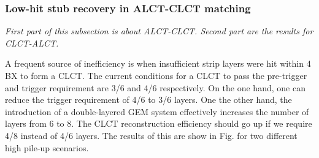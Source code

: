 %
%
%

\subsubsection{Low-hit stub recovery in ALCT-CLCT matching}

\textit{First part of this subsection is about ALCT-CLCT. Second part are the results for CLCT-ALCT.}

A frequent source of inefficiency is when insufficient strip layers were hit within 4 BX to form a CLCT. The current conditions for a CLCT to pass the pre-trigger and trigger requirement are 3/6 and 4/6 respectively. On the one hand, one can reduce the trigger requirement of 4/6 to 3/6 layers. One the other hand, the introduction of a double-layered GEM system effectively increases the number of layers from 6 to 8. The CLCT reconstruction efficiency should go up if we require 4/8 instead of 4/6 layers. The results of this are show in Fig. for two different high pile-up scenarios.

